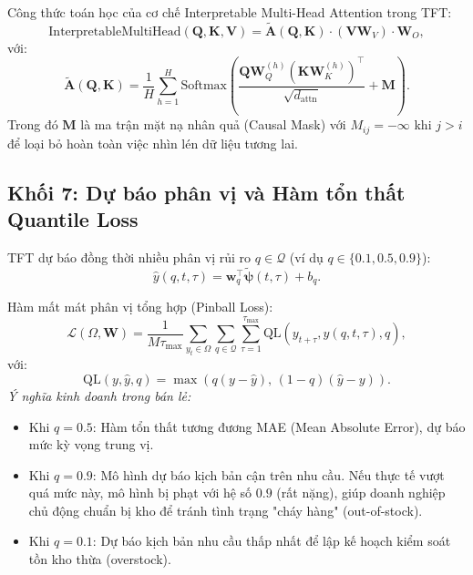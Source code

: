 \documentclass[12pt,a4paper,oneside]{article}
\begin{document}
Công thức toán học của cơ chế Interpretable Multi-Head Attention trong TFT:
\begin{equation}
    \text{InterpretableMultiHead}(\mathbf{Q}, \mathbf{K}, \mathbf{V}) = \tilde{\mathbf{A}}(\mathbf{Q}, \mathbf{K}) \cdot (\mathbf{V} \mathbf{W}_V) \cdot \mathbf{W}_O,
    \label{eq:imha_formula}
\end{equation}
với:
\begin{equation}
    \tilde{\mathbf{A}}(\mathbf{Q}, \mathbf{K}) = \frac{1}{H} \sum_{h=1}^H \text{Softmax}\!\left( \frac{\mathbf{Q}\mathbf{W}_Q^{(h)} (\mathbf{K}\mathbf{W}_K^{(h)})^\top}{\sqrt{d_{\text{attn}}}} + \mathbf{M} \right).
    \label{eq:avg_attn_matrix}
\end{equation}
Trong đó $\mathbf{M}$ là ma trận mặt nạ nhân quả (Causal Mask) với $M_{ij} = -\infty$ khi $j > i$ để loại bỏ hoàn toàn việc nhìn lén dữ liệu tương lai.

\subsection{Khối 7: Dự báo phân vị và Hàm tổn thất Quantile Loss}
\label{subsec:quantile_loss}

TFT dự báo đồng thời nhiều phân vị rủi ro $q \in \mathcal{Q}$ (ví dụ $q \in \{0.1, 0.5, 0.9\}$):
\begin{equation}
    \hat{y}(q, t, \tau) = \mathbf{w}_q^\top \tilde{\bm{\psi}}(t, \tau) + b_q.
    \label{eq:quantile_pred}
\end{equation}

Hàm mất mát phân vị tổng hợp (Pinball Loss):
\begin{equation}
    \mathcal{L}(\Omega, \mathbf{W}) = \frac{1}{M \tau_{\max}} \sum_{y_t \in \Omega} \sum_{q \in \mathcal{Q}} \sum_{\tau=1}^{\tau_{\max}} \text{QL}\!\left(y_{t+\tau}, \hat{y}(q, t, \tau), q\right),
    \label{eq:total_pinball}
\end{equation}
với:
\begin{equation}
    \text{QL}(y, \hat{y}, q) = \max\!\left(q(y - \hat{y}),\, (1 - q)(\hat{y} - y)\right).
    \label{eq:single_pinball}
\end{equation}
\textit{Ý nghĩa kinh doanh trong bán lẻ:}
\begin{itemize}
    \item Khi $q = 0.5$: Hàm tổn thất tương đương MAE (Mean Absolute Error), dự báo mức kỳ vọng trung vị.
    \item Khi $q = 0.9$: Mô hình dự báo kịch bản cận trên nhu cầu. Nếu thực tế vượt quá mức này, mô hình bị phạt với hệ số $0.9$ (rất nặng), giúp doanh nghiệp chủ động chuẩn bị kho để tránh tình trạng "cháy hàng" (out-of-stock).
    \item Khi $q = 0.1$: Dự báo kịch bản nhu cầu thấp nhất để lập kế hoạch kiểm soát tồn kho thừa (overstock).
\end{itemize}
\end{document}
